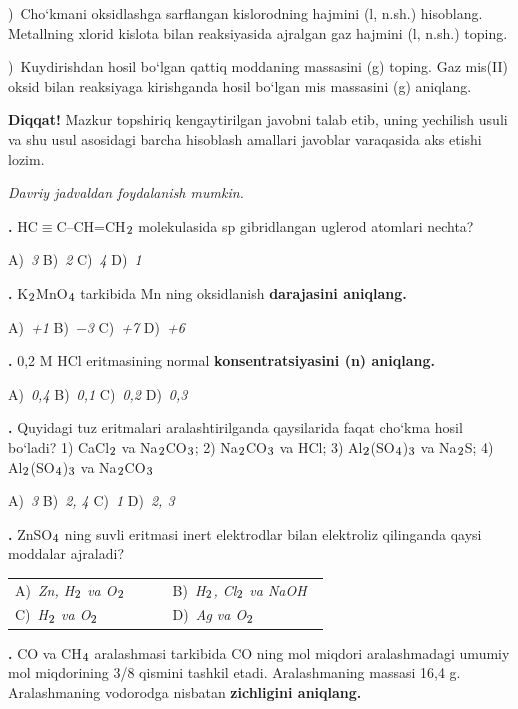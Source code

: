 \documentclass[11pt,a4paper]{article}
\renewcommand{\textsubscript}[1]{\ensuremath{_{\text{\fontsize{8}{8}\selectfont #1}}}}
\newcommand{\qn}[1]{\textbf{\fontsize{11.5}{13}\selectfont #1}}
\newcommand{\qsep}{\par\vspace{13pt}}
\newcommand{\diqqat}[1]{\par\smallskip\noindent\textbf{Diqqat!} #1\par\medskip}
\newcommand{\hdrpill}[1]{\begin{tikzpicture}[baseline=0pt]\node[fill=ygreen,text=white,rounded corners=8pt,inner xsep=10pt,inner ysep=5pt,font=\fontsize{13}{15}\bfseries\selectfont] at (0,0.475){#1};\end{tikzpicture}}
\newcommand{\curvar}{}\fancyhead[R]{\hdrpill{\curvar}}
\begin{document}
)\ Cho`kmani oksidlashga sarflangan kislorodning hajmini (l, n.sh.) hisoblang. Metallning xlorid kislota bilan reaksiyasida ajralgan gaz hajmini (l, n.sh.) toping.\par
{})\ Kuydirishdan hosil bo`lgan qattiq moddaning massasini (g) toping. Gaz mis(II) oksid bilan reaksiyaga kirishganda hosil bo`lgan mis massasini (g) aniqlang.\par
\diqqat{Mazkur topshiriq kengaytirilgan javobni talab etib, uning yechilish usuli va shu usul asosidagi barcha hisoblash amallari javoblar varaqasida aks etishi lozim.}\qsep
\newpage
\renewcommand{\curvar}{16-variant}
\thispagestyle{first}
\noindent\textit{Davriy jadvaldan foydalanish mumkin.}
\par\smallskip
\begin{multicols}{2}
\noindent\qn{1.} HC$\equiv$C--CH=CH\textsubscript{2} molekulasida sp gibridlangan uglerod atomlari nechta?

\noindent A)~\textsl{3} \hfill B)~\textsl{2} \hfill C)~\textsl{4} \hfill D)~\textsl{1}\par
\qsep
\noindent\qn{2.} K\textsubscript{2}MnO\textsubscript{4} tarkibida Mn ning oksidlanish \textbf{darajasini aniqlang.}

\noindent A)~\textsl{+1} \hfill B)~\textsl{$-$3} \hfill C)~\textsl{+7} \hfill D)~\textsl{+6}\par
\qsep
\noindent\qn{3.} 0,2 M HCl eritmasining normal \textbf{konsentratsiyasini (n) aniqlang.}

\noindent A)~\textsl{0,4} \hfill B)~\textsl{0,1} \hfill C)~\textsl{0,2} \hfill D)~\textsl{0,3}\par
\qsep
\noindent\qn{4.} Quyidagi tuz eritmalari aralashtirilganda qaysilarida faqat cho`kma hosil bo`ladi? 1) CaCl\textsubscript{2} va Na\textsubscript{2}CO\textsubscript{3}; 2) Na\textsubscript{2}CO\textsubscript{3} va HCl; 3) Al\textsubscript{2}(SO\textsubscript{4})\textsubscript{3} va Na\textsubscript{2}S; 4) Al\textsubscript{2}(SO\textsubscript{4})\textsubscript{3} va Na\textsubscript{2}CO\textsubscript{3}

\noindent A)~\textsl{3} \hfill B)~\textsl{2, 4} \hfill C)~\textsl{1} \hfill D)~\textsl{2, 3}\par
\qsep
\noindent\qn{5.} ZnSO\textsubscript{4} ning suvli eritmasi inert elektrodlar bilan elektroliz qilinganda qaysi moddalar ajraladi?

\noindent\begin{tabular}{@{}p{0.47\linewidth}@{}p{0.47\linewidth}@{}}
A)~\textsl{Zn, H\textsubscript{2} va O\textsubscript{2}} & B)~\textsl{H\textsubscript{2}, Cl\textsubscript{2} va NaOH} \\
C)~\textsl{H\textsubscript{2} va O\textsubscript{2}} & D)~\textsl{Ag va O\textsubscript{2}} \\
\end{tabular}\par
\qsep
\noindent\qn{6.} CO va CH\textsubscript{4} aralashmasi tarkibida CO ning mol miqdori aralashmadagi umumiy mol miqdorining 3/8 qismini tashkil etadi. Aralashmaning massasi 16,4 g. Aralashmaning vodorodga nisbatan \textbf{zichligini aniqlang.}


\end{multicols}
\end{document}
